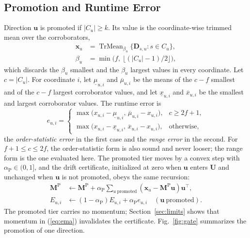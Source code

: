 \documentclass[journal]{IEEEtran}
\theoremstyle{remark}
\newcommand{\Mp}{\bm{M}^{\mathrm{P}}}
\newcommand{\TrMean}{\operatorname{TrMean}}
\begin{document}
\subsection{Promotion and Runtime Error}
Direction $\bm{u}$ is promoted if $|C_u|\ge k$. Its value is the coordinate-wise trimmed mean over the corroborators,
\begin{equation}\label{eq:value}
\begin{aligned}
\bm{x}_u&=\TrMean_{\beta_u}\{\bm{D}_{s,u}:s\in C_u\},\\
\beta_u&=\min\big(f,\ \lfloor(|C_u|-1)/2\rfloor\big),
\end{aligned}
\end{equation}
which discards the $\beta_u$ smallest and the $\beta_u$ largest values in every coordinate. Let $c=|C_u|$. For coordinate $i$, let $\underline{\mu}_{u,i}$ and $\overline{\mu}_{u,i}$ be the means of the $c-f$ smallest and of the $c-f$ largest corroborator values, and let $\underline{x}_{u,i}$ and $\overline{x}_{u,i}$ be the smallest and largest corroborator values. The runtime error is
\begin{equation}\label{eq:err}
e_{u,i}=\begin{cases}\max\big(x_{u,i}-\underline{\mu}_{u,i},\,\overline{\mu}_{u,i}-x_{u,i}\big), & c\ge 2f{+}1,\\[2pt]
\max\big(x_{u,i}-\underline{x}_{u,i},\,\overline{x}_{u,i}-x_{u,i}\big), & \text{otherwise},\end{cases}
\end{equation}
the \emph{order-statistic error} in the first case and the \emph{range error} in the second. For $f+1\le c\le 2f$, the order-statistic form is also sound and never looser; the range form is the one evaluated here. The promoted tier moves by a convex step with $\alpha_{\mathrm{P}}\in(0,1]$, and the drift certificate, initialized at zero when $\bm{u}$ enters $\bm{U}$ and unchanged when $\bm{u}$ is not promoted, obeys the same recursion:
\begin{align}
\Mp&\leftarrow\Mp+\alpha_{\mathrm{P}}\textstyle\sum_{u\ \mathrm{promoted}}(\bm{x}_u-\Mp\bm{u})\bm{u}^{\top},\label{eq:ema}\\
E_{u,i}&\leftarrow(1-\alpha_{\mathrm{P}})E_{u,i}+\alpha_{\mathrm{P}}e_{u,i}\quad(\bm{u}\ \mathrm{promoted}).\label{eq:drift}
\end{align}
The promoted tier carries no momentum; Section~\ref{sec:limits} shows that momentum in (\ref{eq:ema}) invalidates the certificate. Fig.~\ref{fig:gate} summarizes the promotion of one direction.
\end{document}
